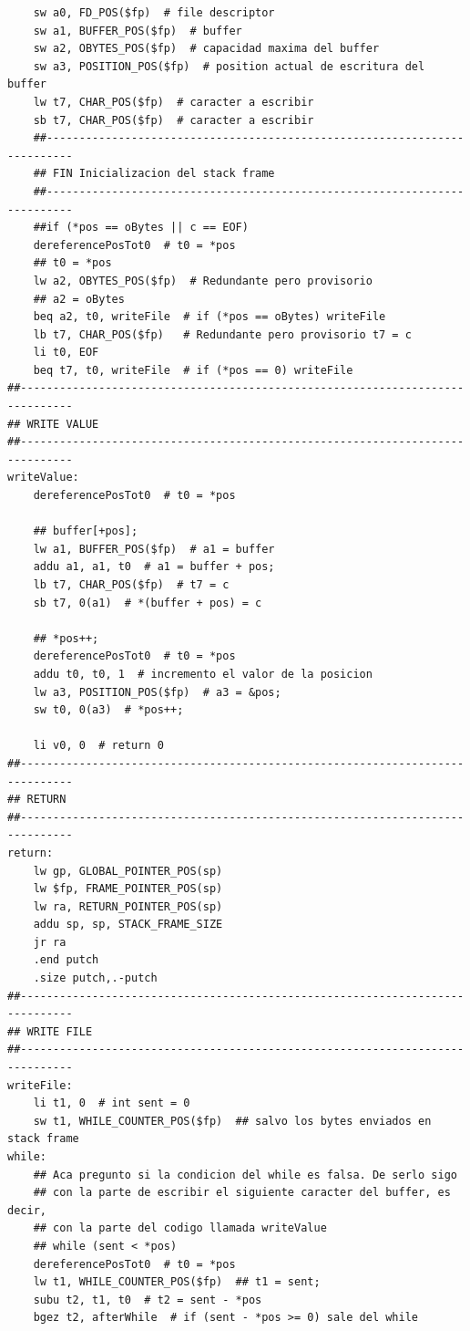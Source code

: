 \documentclass[a4paper,10pt]{article}
\begin{document}
\begin{lstlisting}
    sw a0, FD_POS($fp)  # file descriptor
    sw a1, BUFFER_POS($fp)  # buffer
    sw a2, OBYTES_POS($fp)  # capacidad maxima del buffer
    sw a3, POSITION_POS($fp)  # position actual de escritura del buffer
    lw t7, CHAR_POS($fp)  # caracter a escribir
    sb t7, CHAR_POS($fp)  # caracter a escribir
    ##--------------------------------------------------------------------------
    ## FIN Inicializacion del stack frame
    ##--------------------------------------------------------------------------
    ##if (*pos == oBytes || c == EOF)
    dereferencePosTot0  # t0 = *pos
    ## t0 = *pos
    lw a2, OBYTES_POS($fp)  # Redundante pero provisorio
    ## a2 = oBytes
    beq a2, t0, writeFile  # if (*pos == oBytes) writeFile
    lb t7, CHAR_POS($fp)   # Redundante pero provisorio t7 = c
    li t0, EOF
    beq t7, t0, writeFile  # if (*pos == 0) writeFile
##------------------------------------------------------------------------------
## WRITE VALUE
##------------------------------------------------------------------------------
writeValue:
    dereferencePosTot0  # t0 = *pos

    ## buffer[+pos];
    lw a1, BUFFER_POS($fp)  # a1 = buffer
    addu a1, a1, t0  # a1 = buffer + pos;
    lb t7, CHAR_POS($fp)  # t7 = c
    sb t7, 0(a1)  # *(buffer + pos) = c

    ## *pos++;
    dereferencePosTot0  # t0 = *pos
    addu t0, t0, 1  # incremento el valor de la posicion
    lw a3, POSITION_POS($fp)  # a3 = &pos;
    sw t0, 0(a3)  # *pos++;

    li v0, 0  # return 0
##------------------------------------------------------------------------------
## RETURN
##------------------------------------------------------------------------------
return:
    lw gp, GLOBAL_POINTER_POS(sp)
    lw $fp, FRAME_POINTER_POS(sp)
    lw ra, RETURN_POINTER_POS(sp)
    addu sp, sp, STACK_FRAME_SIZE
    jr ra
    .end putch
    .size putch,.-putch
##------------------------------------------------------------------------------
## WRITE FILE
##------------------------------------------------------------------------------
writeFile:
    li t1, 0  # int sent = 0
    sw t1, WHILE_COUNTER_POS($fp)  ## salvo los bytes enviados en stack frame
while:
    ## Aca pregunto si la condicion del while es falsa. De serlo sigo
    ## con la parte de escribir el siguiente caracter del buffer, es decir,
    ## con la parte del codigo llamada writeValue
    ## while (sent < *pos)
    dereferencePosTot0  # t0 = *pos
    lw t1, WHILE_COUNTER_POS($fp)  ## t1 = sent;
    subu t2, t1, t0  # t2 = sent - *pos
    bgez t2, afterWhile  # if (sent - *pos >= 0) sale del while


\end{lstlisting}
\end{document}
